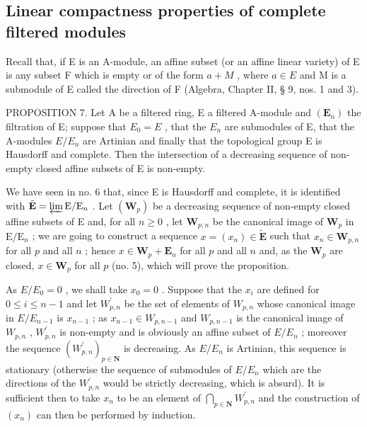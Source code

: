 \subsection{Linear compactness properties of complete filtered modules}

Recall that, if E is an A-module, an affine subset (or an affine linear variety) of E is any subset F which is empty or of the form \(a + M\) , where \(a \in E\) and M is a submodule of E called the direction of F (Algebra, Chapter II, § 9, nos. 1 and 3).

PROPOSITION 7. Let A be a filtered ring, E a filtered A-module and \((\mathbf{E}_{n})\) the filtration of E; suppose that \(E_{0} = E\) , that the \(E_{n}\) are submodules of E, that the A-modules \(E/E_{n}\) are Artinian and finally that the topological group E is Hausdorff and complete. Then the intersection of a decreasing sequence of non-empty closed affine subsets of E is non-empty.

We have seen in no. 6 that, since E is Hausdorff and complete, it is identified with \(\tilde{\mathbf{E}} = \varprojlim \mathrm{E} / \mathrm{E}_n\) . Let \((\mathbf{W}_p)\) be a decreasing sequence of non-empty closed affine subsets of E and, for all \(n \geqslant 0\) , let \(\mathbf{W}_{p,n}\) be the canonical image of \(\mathbf{W}_p\) in \(\mathrm{E} / \mathrm{E}_n\) ; we are going to construct a sequence \(x = (x_n) \in \tilde{\mathbf{E}}\) such that \(x_n \in \mathbf{W}_{p,n}\) for all \(p\) and all \(n\) ; hence \(x \in \mathbf{W}_p + \mathbf{E}_n\) for all \(p\) and all \(n\) and, as the \(\mathbf{W}_p\) are closed, \(x \in \mathbf{W}_p\) for all \(p\) (no. 5), which will prove the proposition.

As \(E/E_{0}=0\) , we shall take \(x_{0}=0\) . Suppose that the \(x_{i}\) are defined for \(0\leqslant i\leqslant n-1\) and let \(W_{p,n}^{\prime}\) be the set of elements of \(W_{p,n}\) whose canonical image in \(E/E_{n-1}\) is \(x_{n-1}\) ; as \(x_{n-1}\in W_{p,n-1}\) and \(W_{p,n-1}\) is the canonical image of \(W_{p,n}\) , \(W_{p,n}^{\prime}\) is non-empty and is obviously an affine subset of \(E/E_{n}\) ; moreover the sequence \((W_{p,n}^{\prime})_{p\in\mathbf{N}}\) is decreasing. As \(E/E_{n}\) is Artinian, this sequence is stationary (otherwise the sequence of submodules of \(E/E_{n}\) which are the directions of the \(W_{p,n}^{\prime}\) would be strictly decreasing, which is absurd). It is sufficient then to take \(x_{n}\) to be an element of \(\bigcap_{p\in\mathbf{N}}W_{p,n}^{\prime}\) and the construction of \((x_{n})\) can then be performed by induction.

